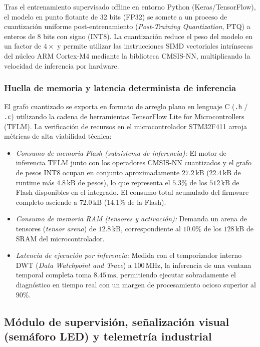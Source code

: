 Tras el entrenamiento supervisado offline en entorno Python (Keras/TensorFlow), el modelo en punto flotante de 32 bits (FP32) se somete a un proceso de cuantización uniforme post-entrenamiento (\textit{Post-Training Quantization}, PTQ) a enteros de 8 bits con signo (INT8). La cuantización reduce el peso del modelo en un factor de $4\times$ y permite utilizar las instrucciones SIMD vectoriales intrínsecas del núcleo ARM Cortex-M4 mediante la biblioteca CMSIS-NN, multiplicando la velocidad de inferencia por hardware.

\subsubsection{Huella de memoria y latencia determinista de inferencia}
El grafo cuantizado se exporta en formato de arreglo plano en lenguaje C (\texttt{.h} / \texttt{.c}) utilizando la cadena de herramientas TensorFlow Lite for Microcontrollers (TFLM). La verificación de recursos en el microcontrolador STM32F411 arroja métricas de alta viabilidad técnica:

\begin{itemize}
    \item \textit{Consumo de memoria Flash (subsistema de inferencia):} El motor de inferencia TFLM junto con los operadores CMSIS-NN cuantizados y el grafo de pesos INT8 ocupan en conjunto aproximadamente $27.2\,\text{kB}$ ($22.4\,\text{kB}$ de runtime más $4.8\,\text{kB}$ de pesos), lo que representa el $5.3\%$ de los $512\,\text{kB}$ de Flash disponibles en el integrado. El consumo total acumulado del firmware completo asciende a $72.0\,\text{kB}$ ($14.1\%$ de la Flash).
    \item \textit{Consumo de memoria RAM (tensores y activación):} Demanda un arena de tensores (\textit{tensor arena}) de $12.8\,\text{kB}$, correspondiente al $10.0\%$ de los $128\,\text{kB}$ de SRAM del microcontrolador.
    \item \textit{Latencia de ejecución por inferencia:} Medida con el temporizador interno DWT (\textit{Data Watchpoint and Trace}) a $100\,\text{MHz}$, la inferencia de una ventana temporal completa toma $8.45\,\text{ms}$, permitiendo ejecutar sobradamente el diagnóstico en tiempo real con un margen de procesamiento ocioso superior al $90\%$.
\end{itemize}

\subsection{Módulo de supervisión, señalización visual (semáforo LED) y telemetría industrial}
\label{subsec:modulo_supervision_telemetria}

